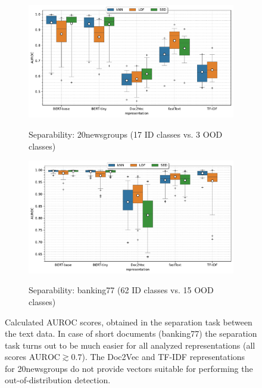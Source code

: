 \begin{figure}[t]
    \centering
    \begin{subfigure}[b]{\textwidth}
        \centering
        \caption{\small Separability: 20newsgroups (17 ID classes vs. 3 OOD classes)}
        \includegraphics[width=\textwidth]{images/real-separability/barplot-20newsgroups-auroc(representation,model)-representation_BERT-base,BERT-tiny,Doc2Vec,fastText,TF-IDF-class_0,16-data_outlier.pdf}
        \label{fig:text-auroc-20newsgroups}
    \end{subfigure}
    \begin{subfigure}[b]{\textwidth}
        \centering
        \caption{\small Separability: banking77 (62 ID classes vs. 15 OOD classes)}
        \includegraphics[width=\textwidth]{images/real-separability/barplot-banking77-auroc(representation,model)-representation_BERT-base,BERT-tiny,Doc2Vec,fastText,TF-IDF-class_0,61-data_outlier.pdf}
        \label{fig:text-auroc-banking77}
    \end{subfigure}
    \caption{Calculated AUROC scores, obtained in the separation task between the text data. In case of short documents (banking77) the separation task turns out to be much easier for all analyzed representations (all scores $\text{AUROC} \gtrsim 0.7$). The Doc2Vec and TF-IDF representations for 20newsgroups do not provide vectors suitable for performing the out-of-distribution detection.}
    \label{fig:text-auroc}
\end{figure}

\cleardoublepage{}

